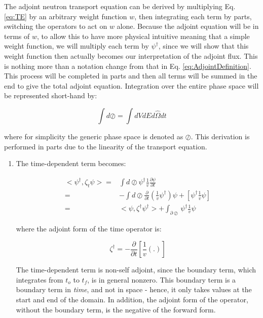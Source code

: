 \documentclass[10pt]{article}
\begin{document}
\begin{flushleft}
The adjoint neutron transport equation can be derived by multiplying Eq. \ref{eq:TE} by an arbitrary weight function \(w\), then integrating each term by parts, switching the operators to act on \(w\) alone. Because the adjoint equation will be in terms of \(w\), to allow this to have more physical intuitive meaning that a simple weight function, we will multiply each term by \(\psi^\dagger\), since we will show that this weight function then actually becomes our interpretation of the adjoint flux. This is nothing more than a notation change from that in Eq. \ref{eq:AdjointDefinition}. This process will be completed in parts and then all terms will be summed in the end to give the total adjoint equation. Integration over the entire phase space will be represented short-hand by:

\begin{equation}
\label{eq:PhaseSpaceIntegration}
\int d\oslash = \int dVdEd\hat{\Omega}dt
\end{equation}

where for simplicity the generic phase space is denoted as \(\oslash\). This derivation is performed in parts due to the linearity of the transport equation.

\begin{enumerate}
\item The time-dependent term becomes:

\begin{equation}
\label{eq:AdjointTime}
\begin{aligned}
<\psi^\dagger, \zeta_t\psi> = & \int d\oslash \psi^\dagger \frac{1}{v} \frac{\partial\psi}{\partial t}\\
= & -\int d\oslash \frac{\partial}{\partial t} \left(\frac{1}{v}\psi^\dagger\right)\psi + [\psi^\dagger \frac{1}{v} \psi]\\
= & <\psi, \zeta^\dagger\psi^\dagger> + \int_{\partial\oslash}\psi^\dagger \frac{1}{v} \psi
\end{aligned}
\end{equation}

where the adjoint form of the time operator is:

\begin{equation}
\zeta^\dagger = -\frac{\partial}{\partial t}\left\lbrack\frac{1}{v}(.)\right\rbrack
\end{equation}

The time-dependent term is non-self adjoint, since the boundary term, which integrates from \(t_o\) to \(t_f\), is in general nonzero. This boundary term is a boundary term in \textit{time}, and not in space - hence, it only takes values at the start and end of the domain. In addition, the adjoint form of the operator, without the boundary term, is the negative of the forward form. 


\end{enumerate}
\end{flushleft}
\end{document}
